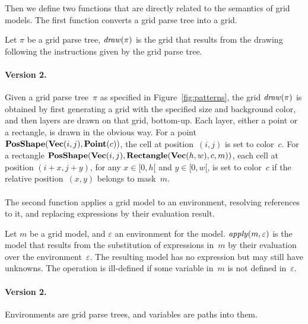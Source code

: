 \documentclass[a4paper]{llncs}
\begin{document}
Then we define two functions that are directly related to the
semantics of grid models. The first function converts a grid parse tree
into a grid.

\begin{definition}
  Let $\pi$ be a grid parse tree, ${\it draw}(\pi)$ is the grid that
  results from the drawing following the instructions given by the
  grid parse tree.  
\end{definition}

\paragraph{Version 2.} Given a grid parse tree~$\pi$ as specified in
Figure~\ref{fig:patterns}, the grid ${\it draw}(\pi)$ is obtained by
first generating a grid with the specified size and background color,
and then layers are drawn on that grid, bottom-up. Each layer, either
a point or a rectangle, is drawn in the obvious way. For a point
${\bf PosShape}({\bf Vec}(i,j), {\bf Point}(c))$, the cell at
position~$(i,j)$ is set to color~$c$. For a rectangle
${\bf PosShape}({\bf Vec}(i,j), {\bf Rectangle}({\bf Vec}(h,w),c,m))$,
each cell at position $(i+x,j+y)$, for any $x \in [0,h[$ and
$y \in [0,w[$, is set to color~$c$ if the relative position~$(x,y)$
belongs to mask~$m$.

\paragraph{}
The second function applies a grid model to an
environment, resolving references to it, and replacing expressions by
their evaluation result.

\begin{definition}
  Let $m$ be a grid model, and $\varepsilon$ an environment for the
  model. ${\it apply}(m,\varepsilon)$ is the model that results from
  the substitution of expressions in~$m$ by their evaluation over the
  environment~$\varepsilon$. The resulting model has no expression but
  may still have unknowns.
  The operation is ill-defined if some variable in~$m$ is not defined
  in~$\varepsilon$. 
\end{definition}

\paragraph{Version 2.} Environments are grid parse trees, and
variables are paths into them.
\end{document}
